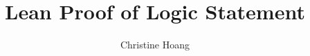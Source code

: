 \documentclass{article}
\title{Lean Proof of Logic Statement}
\author{Christine Hoang}
\begin{document}
\maketitle

\section{}
\end{document}

